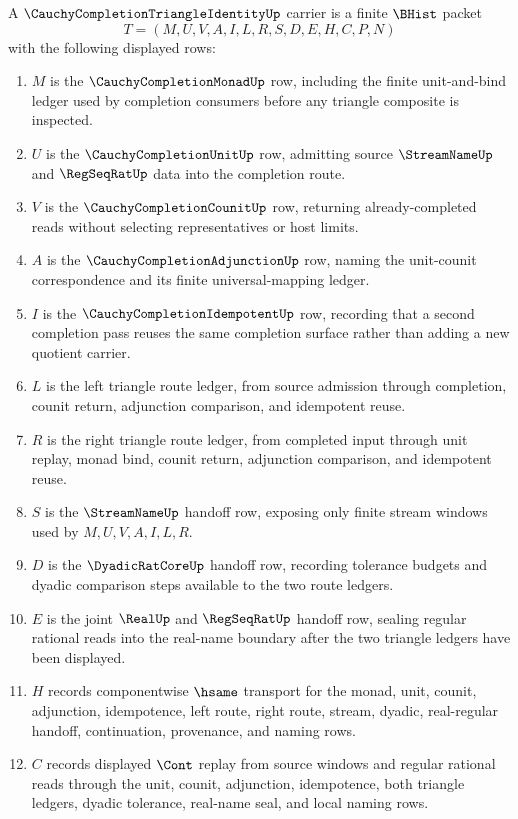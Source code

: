 \begin{definition}
\label{def:cauchy-completion-triangle-identity-carrier}
A $\CauchyCompletionTriangleIdentityUp$ carrier is a finite $\BHist$ packet
$$
T=(M,U,V,A,I,L,R,S,D,E,H,C,P,N)
$$
with the following displayed rows:
\begin{enumerate}
\item $M$ is the $\CauchyCompletionMonadUp$ row, including the finite unit-and-bind ledger used by completion consumers before any triangle composite is inspected.
\item $U$ is the $\CauchyCompletionUnitUp$ row, admitting source $\StreamNameUp$ and $\RegSeqRatUp$ data into the completion route.
\item $V$ is the $\CauchyCompletionCounitUp$ row, returning already-completed reads without selecting representatives or host limits.
\item $A$ is the $\CauchyCompletionAdjunctionUp$ row, naming the unit-counit correspondence and its finite universal-mapping ledger.
\item $I$ is the $\CauchyCompletionIdempotentUp$ row, recording that a second completion pass reuses the same completion surface rather than adding a new quotient carrier.
\item $L$ is the left triangle route ledger, from source admission through completion, counit return, adjunction comparison, and idempotent reuse.
\item $R$ is the right triangle route ledger, from completed input through unit replay, monad bind, counit return, adjunction comparison, and idempotent reuse.
\item $S$ is the $\StreamNameUp$ handoff row, exposing only finite stream windows used by $M,U,V,A,I,L,R$.
\item $D$ is the $\DyadicRatCoreUp$ handoff row, recording tolerance budgets and dyadic comparison steps available to the two route ledgers.
\item $E$ is the joint $\RealUp$ and $\RegSeqRatUp$ handoff row, sealing regular rational reads into the real-name boundary after the two triangle ledgers have been displayed.
\item $H$ records componentwise $\hsame$ transport for the monad, unit, counit, adjunction, idempotence, left route, right route, stream, dyadic, real-regular handoff, continuation, provenance, and naming rows.
\item $C$ records displayed $\Cont$ replay from source windows and regular rational reads through the unit, counit, adjunction, idempotence, both triangle ledgers, dyadic tolerance, real-name seal, and local naming rows.

\end{enumerate}
\end{definition}
